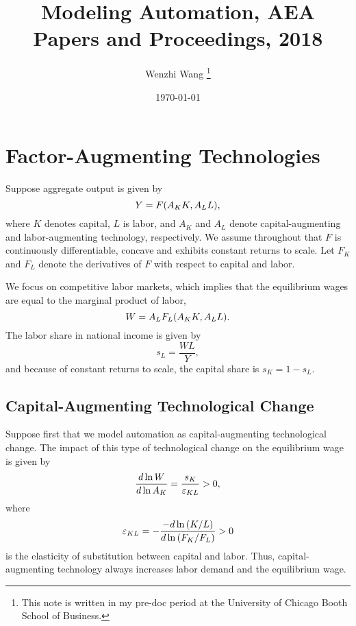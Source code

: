 \documentclass[12pt]{article}
\theoremstyle{definition}
\begin{document}

\title{\bf Modeling Automation, AEA Papers and Proceedings, 2018}
\author{Wenzhi Wang \thanks{This note is written in my pre-doc period at the University of Chicago Booth School of Business.} } 
\date{\today}
\maketitle

\section{Factor-Augmenting Technologies}

Suppose aggregate output is given by 
\begin{equation}
    \notag 
    Y = F{\left( A_K K, A_L L \right)},
\end{equation}
where $K$ denotes capital, $L$ is labor, and $A_K$ and $A_L$ denote capital-augmenting and labor-augmenting technology, respectively. We assume throughout that $F$ is continuously differentiable, concave and exhibits constant returns to scale. Let $F_K$ and $F_L$ denote the derivatives of $F$ with respect to capital and labor. 

We focus on competitive labor markets, which implies that the equilibrium wages are equal to the marginal product of labor, 
$$
W = A_L F_L{\left( A_K K, A_L L \right)}.
$$
The labor share in national income is given by 
$$
s_L = \frac{WL}{Y},
$$
and because of constant returns to scale, the capital share is $s_K = 1 - s_L$.

\subsection{Capital-Augmenting Technological Change}

Suppose first that we model automation as capital-augmenting technological change. The impact of this type of technological change on the equilibrium wage is given by 
\begin{equation}
    \label{eq_catc}
    \frac{d \ln W}{d \ln A_K} = \frac{s_K}{\ve_{KL}} > 0,
\end{equation}
where 
\begin{equation}
    \label{eq_elasticity_of_substitution}
    \ve_{KL} = - \frac{- d \ln \of{K / L}}{d \ln \of{F_K / F_L}} > 0
\end{equation}
is the elasticity of substitution between capital and labor. Thus, capital-augmenting technology always increases labor demand and the equilibrium wage.
\end{document}
